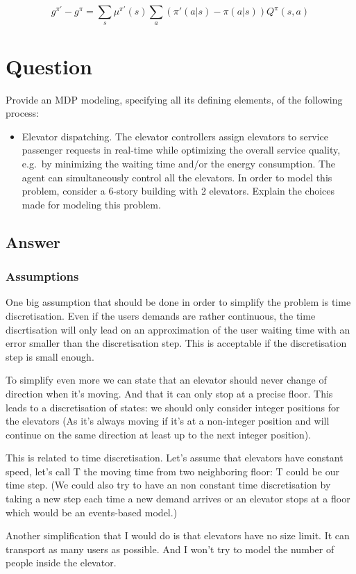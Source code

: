 \documentclass[a4paper]{article}
\begin{document}
$$g^{\pi'} - g^\pi = \sum_s \mu^{\pi'}(s) \sum_a (\pi'(a|s) - \pi(a|s))Q^{\pi}(s,a)$$


\section{Question}
Provide an MDP modeling, specifying all its defining elements, of the following process:
\begin{itemize}
    \item Elevator dispatching. The elevator controllers assign elevators to service passenger requests in real-time while optimizing the overall service quality, e.g.\ by minimizing the waiting time and/or the energy consumption. The agent can simultaneously control all the elevators. In order to model this problem, consider a 6-story building with 2 elevators. Explain the choices made for modeling this problem.
\end{itemize}

\subsection*{Answer}
\subsubsection*{Assumptions}
One big assumption that should be done in order to simplify the problem is time discretisation. Even if the users demands are rather continuous,
the time discrtisation will only lead on an approximation of the user waiting time with an error smaller than the discretisation step.
This is acceptable if the discretisation step is small enough.

To simplify even more we can state that an elevator should never change of direction when it's moving. And that it can only stop at a precise floor.
This leads to a discretisation of states: we should only consider integer positions for the elevators (As it's always moving if it's at a non-integer
position and will continue on the same direction at least up to the next integer position).

This is related to time discretisation. Let's assume that elevators have constant speed, let's call T the moving time from two neighboring floor: T
could be our time step. (We could also try to have an non constant time discretisation by taking a new step each time a new demand arrives or an elevator
stops at a floor which would be an events-based model.)

Another simplification that I would do is that elevators have no size limit. It can transport as many users as possible. And I won't try to model
the number of people inside the elevator.
\end{document}
